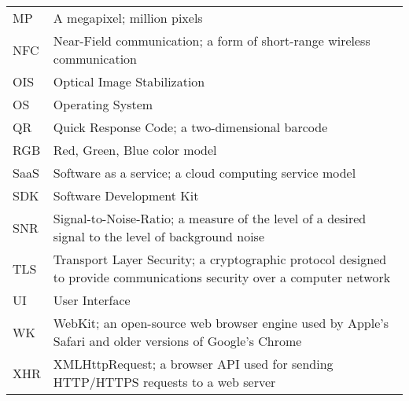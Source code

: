 \documentclass[thesis.tex]{subfiles}
\begin{document}
\begin{longtable}{@{}p{}p{}@{}}
MP & A megapixel; million pixels \\
NFC & Near-Field communication; a form of short-range wireless communication \\
OIS & Optical Image Stabilization \\
OS & Operating System \\
QR & Quick Response Code; a two-dimensional barcode \\
RGB & Red, Green, Blue color model \\
SaaS & Software as a service; a cloud computing service model \\
SDK & Software Development Kit \\
SNR & Signal-to-Noise-Ratio; a measure of the level of a desired signal to the level of background noise\\
TLS & Transport Layer Security; a cryptographic protocol designed to provide communications security over a computer network \\
UI & User Interface \\
WK & WebKit; an open-source web browser engine used by Apple's Safari and older versions of Google's Chrome \\
XHR & XMLHttpRequest; a browser API used for sending HTTP/HTTPS requests to a web server \\

\end{longtable}
\end{document}
